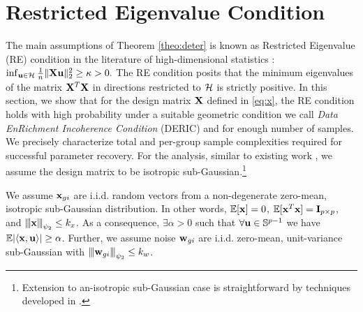 \section{Restricted Eigenvalue Condition}
\label{sec:re}
The main assumptions of Theorem \ref{theo:deter} is known as Restricted Eigenvalue (RE) condition in the literature of high-dimensional statistics \cite{banerjee14, nrwy12, raskutti10}:
$\inf_{\u \in \cH} \frac{1}{n} \norm{\X \u}{2}^2 \geq \kappa > 0.$
The RE condition posits that the minimum eigenvalues of the matrix $\mathbf{X}^T \mathbf{X}$ in directions restricted to $\cH$ is strictly positive.
In this section, we show that for the design matrix $\mathbf{X}$ defined in \eqref{eq:x}, the RE condition holds with high probability under a suitable geometric condition we call {\em Data EnRichment Incoherence Condition} (DERIC) and for enough number of samples.
We precisely characterize total and per-group sample complexities required for successful parameter recovery.
For the analysis, similar to existing work \cite{guba16, mend15, trop15}, we assume the design matrix to be isotropic sub-Gaussian.\footnote{Extension to an-isotropic sub-Gaussian case is straightforward by techniques developed in \cite{banerjee14, ruzh13}.}
\begin{definition}
	\label{def:obs}
	We assume $\mathbf{x}_{gi}$ are i.i.d. random vectors from a non-degenerate zero-mean, isotropic sub-Gaussian distribution. In other words, $\mathbb{E} [\mathbf{x}] = 0$, $\mathbb{E} [\mathbf{x}^T \mathbf{x}] = \mathbf{I}_{p \times p}$, and ${\left\vert\kern-0.25ex\left\vert\kern-0.25ex\left\vert \mathbf{x} \right\vert\kern-0.25ex\right\vert\kern-0.25ex\right\vert}_{\psi_2} \leq k_x$.	
As a consequence, $\exists \alpha > 0$ such that $\forall \mathbf{u} \in \mathbb S^{p-1}$ we have $ \mathbb{E}|\langle \mathbf{x}, \mathbf{u} \rangle| \geq \alpha$. Further, we assume noise $\mathbf{w}_{gi} $ are i.i.d.
zero-mean, unit-variance sub-Gaussian with ${\left\vert\kern-0.25ex\left\vert\kern-0.25ex\left\vert \mathbf{w}_{gi} \right\vert\kern-0.25ex\right\vert\kern-0.25ex\right\vert}_{\psi_2} \leq k_w$.
\end{definition}


